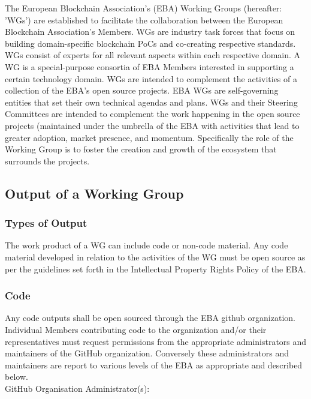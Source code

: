 \documentclass{article}
\begin{document}
The European Blockchain Association’s (EBA) Working Groups (hereafter: 'WGs') are established to facilitate the collaboration between the European Blockchain Association’s Members. 
WGs are industry task forces that focus on building domain-specific blockchain PoCs and co-creating respective standards. 
WGs consist of experts for all relevant aspects within each respective domain. 
A WG is a special-purpose consortia of EBA Members interested in supporting a certain technology domain. 
WGs are intended to complement the activities of a collection of the EBA’s open source projects. 
EBA WGs are self-governing entities that set their own technical agendas and plans. 
WGs and their Steering Committees are intended to complement the work happening in the open source projects (maintained under the umbrella of the EBA  with activities that lead to greater adoption, market presence, and momentum. Specifically the role of the Working Group is to foster the creation and growth of the ecosystem that surrounds the projects.

\subsection{Output of a Working Group}

\subsubsection{Types of Output}

The work product of a WG can include code or non-code material. 
Any code material developed in relation to the activities of the WG must be open source as per the guidelines set forth in the Intellectual Property Rights Policy of the EBA.

\subsubsection{Code}

Any code outputs shall be open sourced through the EBA github organization. 
Individual Members contributing code to the organization and/or their representatives must request permissions from the appropriate administrators and maintainers of the GitHub organization. 
Conversely these administrators and maintainers are report to various levels of the EBA as appropriate and described below. \\

GitHub Organisation Administrator(s): \\
\end{document}

